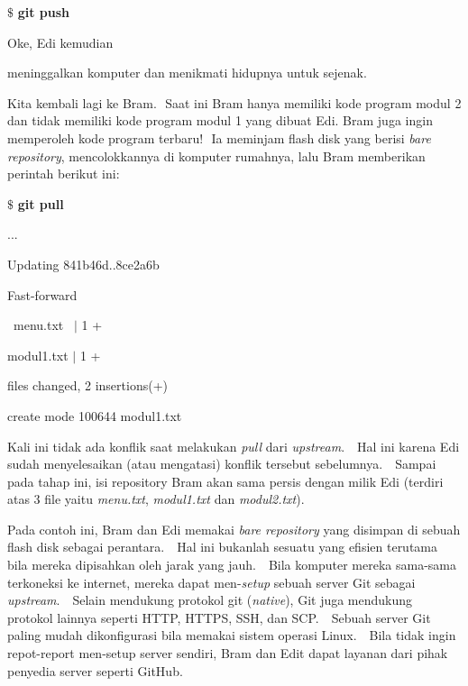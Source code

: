 \vspace{12pt}
\noindent 
 $  \$  $ \textbf{git push} \par
\noindent 
Oke, Edi kemudian  \par
\noindent 
meninggalkan komputer dan menikmati hidupnya untuk sejenak. \par
\noindent 
Kita kembali lagi ke Bram. $  $ Saat ini Bram hanya memiliki kode program modul 2 dan tidak memiliki kode program modul 1 yang dibuat Edi. Bram juga ingin memperoleh kode program terbaru! $  $ Ia meminjam flash disk yang berisi \textit{bare repository}, mencolokkannya di komputer rumahnya, lalu Bram memberikan perintah berikut ini: \par
\vspace{12pt}
\noindent 
 $  \$  $ \textbf{git pull} \par
\noindent 
... \par
\noindent 
Updating 841b46d..8ce2a6b \par
\noindent 
Fast-forward \par
\noindent 
~menu.txt~   $  \vert  $ 1 + \par
\noindent 
 modul1.txt  $  \vert  $ 1 + \par
{} files changed, 2 insertions(+) \par
\noindent 
 create mode 100644 modul1.txt \par
\noindent 
\vspace{12pt}
\noindent 
\vspace{12pt}
\noindent 
\vspace{12pt}
\noindent 
Kali ini tidak ada konflik saat melakukan \textit{pull} dari \textit{upstream}. $  $ $  $ Hal ini karena Edi sudah menyelesaikan (atau mengatasi) konflik tersebut sebelumnya. $  $ $  $ Sampai pada tahap ini, isi repository Bram akan sama persis dengan milik Edi (terdiri atas 3 file yaitu \textit{menu.txt}, \textit{modul1.txt} dan \textit{modul2.txt}). \par
\vspace{12pt}
\noindent 
Pada contoh ini, Bram dan Edi memakai \textit{bare repository} yang disimpan di sebuah flash disk sebagai perantara. $  $ $  $ Hal ini bukanlah sesuatu yang efisien terutama bila mereka dipisahkan oleh jarak yang jauh. $  $ $  $ Bila komputer mereka sama-sama terkoneksi ke internet, mereka dapat men-\textit{setup} sebuah server Git sebagai \textit{upstream}. $  $ $  $ Selain mendukung protokol git (\textit{native}), Git juga mendukung protokol lainnya seperti HTTP, HTTPS, SSH, dan SCP. $  $ $  $ Sebuah server Git paling mudah dikonfigurasi bila memakai sistem operasi Linux. $  $ $  $ Bila tidak ingin repot-report men-setup server sendiri, Bram dan Edit dapat layanan dari pihak penyedia server seperti GitHub. \par
\vspace{12pt}

